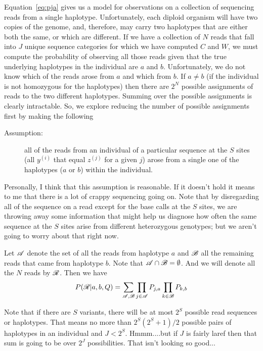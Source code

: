Equation~\ref{eq:pja} gives us a model for observations on a collection of sequencing reads
from a single haplotype.  Unfortunately, each diploid organism will have two copies of the
genome, and, therefore, may carry two haplotypes that are either both the same, or which are
different.  If we have a collection of $N$ reads that fall into $J$ unique sequence
categories for
which we have computed $C$ and $W$, we must 
compute the probability of observing all those reads given that the true underlying 
haplotypes in the individual are $a$ and $b$.  Unfortunately, we do not know which of the
reads arose from $a$ and which from $b$.  If $a\neq b$ (\ie if the individual is not
homozygous for the haplotypes) then there are $2^N$ possible assignments of reads to the two
different haplotypes.  Summing over the possible assignments is clearly intractable.  So, we
explore reducing the number of possible assignments first by making the following
\begin{description}
\item[Assumption:] all of the reads from an individual of a particular sequence at
the $S$ sites (\ie all $y^{(i)}$ that equal $z^{(j)}$ for a given $j$) arose
from a single one of the haplotypes ($a$ or $b$) within the individual.
\end{description}
Personally, I think that this assumption is reasonable. If it doesn't hold it means to me that
there is a lot of crappy sequencing going on. Note that by disregarding all of the sequence on
a read except for the base calls at the $S$ sites, we are throwing away some information that
might help us diagnose how often the same sequence at the $S$ sites arise from different
heterozygous genotypes; but we aren't going to worry about that right now.

Let $\mathscr{A}$ denote the set of all the reads from haplotype $a$ and $\mathscr{B}$ all the remaining
reads that came from haplotype $b$.   Note that $\mathscr{A} \cap \mathscr{B} = \emptyset$. And we will
denote all the $N$ reads by $\mathscr{R}$.
Then we have
\[
P(\mathscr{R}|a,b, Q) = \sum_{\mathscr{A},\mathscr{B}} \prod_{j \in \mathscr{A}} P_{j,a} 
\prod_{k \in \mathscr{B}} P_{k,b} 
\]


Note that if there are $S$ variants, there will be at most $2^S$ possible read sequences or 
haplotypes.  That means no more than $2^S(2^S + 1) / 2$ possible pairs of haplotypes in an 
individual and $J < 2^S$.  Hmmm....but if $J$ is fairly laref then that sum is going to be
over $2^J$ possibilities.  That isn't looking so good...



